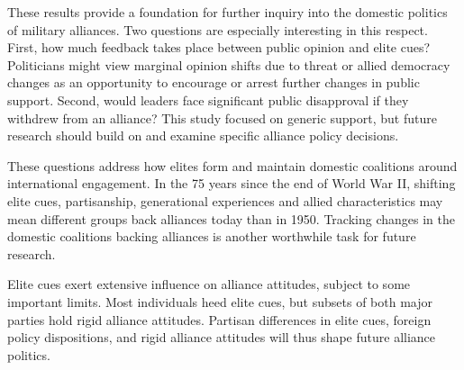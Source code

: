 \documentclass[12pt]{article}
\begin{document}
These results provide a foundation for further inquiry into the domestic politics of military alliances. 
Two questions are especially interesting in this respect.
First, how much feedback takes place between public opinion and elite cues? 
Politicians might view marginal opinion shifts due to threat or allied democracy changes as an opportunity to encourage or arrest further changes in public support.
Second, would leaders face significant public disapproval if they withdrew from an alliance? 
This study focused on generic support, but future research should build on \citet{TomzWeeks2021} and examine specific alliance policy decisions. 


These questions address how elites form and maintain domestic coalitions around international engagement. 
In the 75 years since the end of World War II, shifting elite cues, partisanship, generational experiences and allied characteristics may mean different groups back alliances today than in 1950. 
Tracking changes in the domestic coalitions backing alliances is another worthwhile task for future research.


Elite cues exert extensive influence on alliance attitudes, subject to some important limits.
Most individuals heed elite cues, but subsets of both major parties hold rigid alliance attitudes. 
Partisan differences in elite cues, foreign policy dispositions, and rigid alliance attitudes will thus shape future alliance politics.



\newpage

 
 
\end{document}
